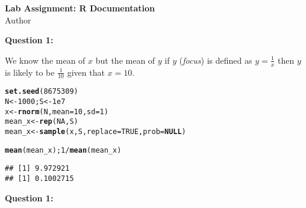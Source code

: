 \documentclass[12pt]{article}\usepackage[]{graphicx}\usepackage[]{color}
\makeatletter
\newcommand{\hlnum}[1]{\textcolor[rgb]{0.686,0.059,0.569}{#1}}%
\newcommand{\hlopt}[1]{\textcolor[rgb]{0,0,0}{#1}}%
\newcommand{\hlstd}[1]{\textcolor[rgb]{0.345,0.345,0.345}{#1}}%
\newcommand{\hlkwa}[1]{\textcolor[rgb]{0.161,0.373,0.58}{\textbf{#1}}}%
\newcommand{\hlkwb}[1]{\textcolor[rgb]{0.69,0.353,0.396}{#1}}%
\newcommand{\hlkwc}[1]{\textcolor[rgb]{0.333,0.667,0.333}{#1}}%
\newcommand{\hlkwd}[1]{\textcolor[rgb]{0.737,0.353,0.396}{\textbf{#1}}}%
\newenvironment{kframe}{%
 \def\at@end@of@kframe{}%
 \ifinner\ifhmode%
  \def\at@end@of@kframe{\end{minipage}}%
  \begin{minipage}{\columnwidth}%
 \fi\fi%
 \def\FrameCommand##1{\hskip\@totalleftmargin \hskip-\fboxsep
 \colorbox{shadecolor}{##1}\hskip-\fboxsep
     \hskip-\linewidth \hskip-\@totalleftmargin \hskip\columnwidth}%
 \MakeFramed {\advance\hsize-\width
   \@totalleftmargin\z@ \linewidth\hsize
   \@setminipage}}%
 {\par\unskip\endMakeFramed%
 \at@end@of@kframe}
\newenvironment{knitrout}{}{} %
\makeatother
\begin{document}
\begin{center}
\textbf{Lab Assignment: R Documentation}\\
Author\\
\end{center}
\begin{flushleft}

\noindent \textbf{Question 1:}

We know the mean of $x$ but the mean of $y$ if $y$ (\textit{focus}) is defined as $y = \frac{1}{x}$ then $y$ is likely to be $\frac{1}{10}$ given that $x=10$. 

\begin{knitrout}
\color{fgcolor}\begin{kframe}
\begin{alltt}
\hlkwd{set.seed}\hlstd{(}\hlnum{8675309}\hlstd{)}
\hlstd{N} \hlkwb{<-} \hlnum{1000}\hlstd{; S} \hlkwb{<-} \hlnum{1e7}
\hlstd{x} \hlkwb{<-} \hlkwd{rnorm}\hlstd{(N,} \hlkwc{mean}\hlstd{=}\hlnum{10}\hlstd{,} \hlkwc{sd}\hlstd{=}\hlnum{1}\hlstd{)}
\hlstd{mean_x} \hlkwb{<-} \hlkwd{rep}\hlstd{(}\hlnum{NA}\hlstd{, S)}
\hlstd{mean_x} \hlkwb{<-} \hlkwd{sample}\hlstd{(x, S,} \hlkwc{replace}\hlstd{=}\hlnum{TRUE}\hlstd{,} \hlkwc{prob} \hlstd{=} \hlkwa{NULL}\hlstd{)}

\hlkwd{mean}\hlstd{(mean_x);} \hlnum{1}\hlopt{/}\hlkwd{mean}\hlstd{(mean_x)}
\end{alltt}
\begin{verbatim}
## [1] 9.972921
## [1] 0.1002715
\end{verbatim}
\end{kframe}
\end{knitrout}

\textbf{Question 1:}



\end{flushleft}
\end{document}
